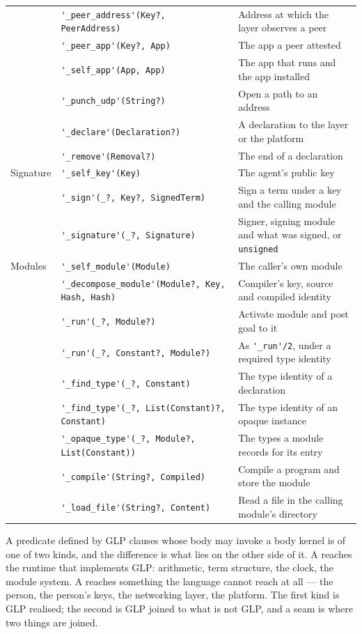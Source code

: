 \begin{center}
{\begin{tabular}{@{}l@{\hspace{4pt}}l@{\hspace{4pt}}p{}@{}}
 & \verb|'_peer_address'(Key?, PeerAddress)| & Address at which the layer observes a peer \\
 & \verb|'_peer_app'(Key?, App)| & The app a peer attested \\
 & \verb|'_self_app'(App, App)| & The app that runs and the app installed \\
 & \verb|'_punch_udp'(String?)| & Open a path to an address \\
 & \verb|'_declare'(Declaration?)| & A declaration to the layer or the platform \\
 & \verb|'_remove'(Removal?)| & The end of a declaration \\
\hline
Signature & \verb|'_self_key'(Key)| & The agent's public key \\
 & \verb|'_sign'(_?, Key?, SignedTerm)| & Sign a term under a key and the calling module \\
 & \verb|'_signature'(_?, Signature)| & Signer, signing module and what was signed, or \verb|unsigned| \\
\hline
Modules & \verb|'_self_module'(Module)| & The caller's own module \\
 & \verb|'_decompose_module'(Module?, Key, Hash, Hash)| & Compiler's key, source and compiled identity \\
 & \verb|'_run'(_?, Module?)| & Activate module and post goal to it \\
 & \verb|'_run'(_?, Constant?, Module?)| & As \verb|'_run'/2|, under a required type identity \\
 & \verb|'_find_type'(_?, Constant)| & The type identity of a declaration \\
 & \verb|'_find_type'(_?, List(Constant)?, Constant)| & The type identity of an opaque instance \\
 & \verb|'_opaque_type'(_?, Module?, List(Constant))| & The types a module records for its entry \\
 & \verb|'_compile'(String?, Compiled)| & Compile a program and store the module \\
 & \verb|'_load_file'(String?, Content)| & Read a file in the calling module's directory \\
\end{tabular}
}
\end{center}

A predicate defined by GLP clauses whose body may invoke a body kernel is of one of two kinds, and the difference is what lies on the other side of it. A  reaches the runtime that implements GLP: arithmetic, term structure, the clock, the module system. A  reaches something the language cannot reach at all --- the person, the person's keys, the networking layer, the platform. The first kind is GLP realised; the second is GLP joined to what is not GLP, and a seam is where two things are joined.

